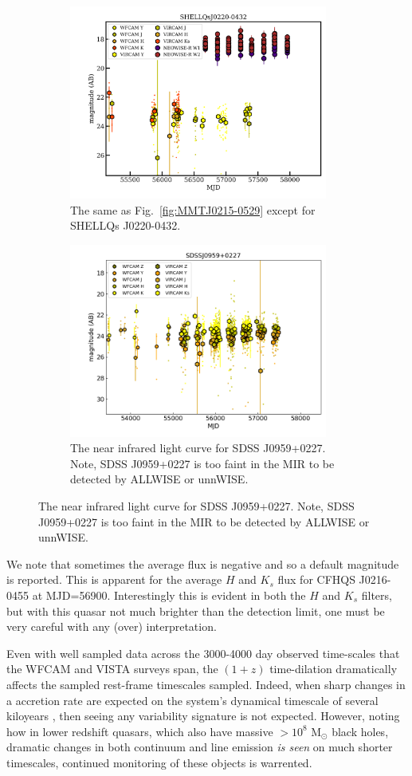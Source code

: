 \documentclass[usenatbib]{mnras}
\begin{document}
\begin{figure}
  \begin{subfigure}{}\quad
    \centering
    \includegraphics[width=8.5cm]{../light_curves/SHELLQsJ0220-0432LC_20190214.png}
    \caption{The same as Fig.~\ref{fig:MMTJ0215-0529} except for SHELLQs J0220-0432.}
    \label{fig:SHELLQsJ0220-0432}
  \end{subfigure}
  \begin{subfigure}{}\quad
    \centering
    \includegraphics[width=8.5cm]{../light_curves/SDSSJ0959+0227LC_20190612.png}
    \caption{The near infrared light curve for SDSS J0959+0227. Note, 
      SDSS J0959+0227 is too faint in the MIR to be detected by ALLWISE or unnWISE.}
    \label{fig:SDSSJ0959+0227}
  \end{subfigure}
  \medskip
\end{figure}

We note that sometimes the average flux is negative and so a default
magnitude is reported.  This is apparent for the average $H$ and
$K_{s}$ flux for CFHQS J0216-0455 at MJD=56900.  Interestingly this is
evident in both the $H$ and $K_{s}$ filters, but with this quasar not
much brighter than the detection limit, one must be very careful with
any (over) interpretation.

Even with well sampled data across the 3000-4000 day observed
time-scales that the WFCAM and VISTA surveys span, the $(1+z)$
time-dilation dramatically affects the sampled rest-frame timescales
sampled. Indeed, when sharp changes in a accretion rate are expected
on the system's dynamical timescale of several kiloyears
\citep[e.g.,][]{Regan2019}, then seeing any variability signature is
not expected. However, noting how in lower redshift quasars, which
also have massive $>10^{8}$ M$_{\odot}$ black holes, dramatic changes
in both continuum and line emission {\it is seen} on much shorter
timescales, continued monitoring of these objects is warrented.
\end{document}
